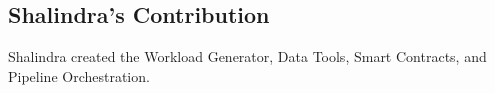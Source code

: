 \subsection{Shalindra's Contribution}
\label{sec:shalindra_contribution}
Shalindra created the Workload Generator, Data Tools, Smart Contracts, and Pipeline Orchestration.